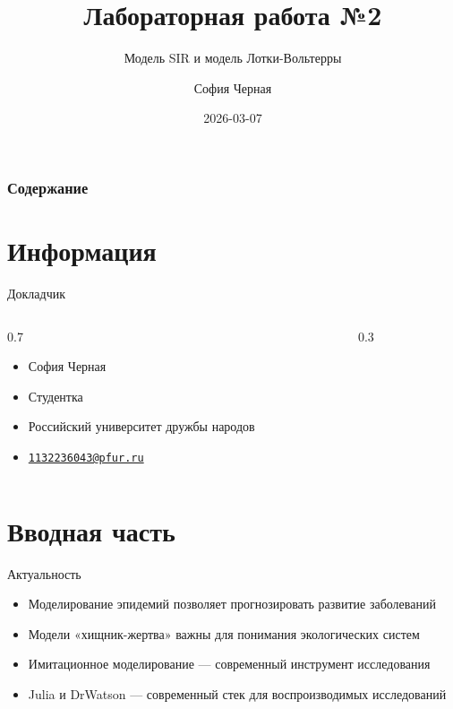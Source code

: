 \documentclass[
  ignorenonframetext,
  aspectratio=169,
  russian,
]{beamer}
\title{Лабораторная работа №2}
\subtitle{Модель SIR и модель Лотки-Вольтерры}
\author{София Черная}
\date{2026-03-07}
\providecommand{\tightlist}{%
  \setlength{\itemsep}{0pt}\setlength{\parskip}{0pt}}\usepackage{longtable,booktabs,array}
\renewcommand*\contentsname{Содержание}
\newcommand\contentsname{Содержание}
\begin{document}
\frame{\titlepage}

\renewcommand*\contentsname{Содержание}
\begin{frame}[allowframebreaks]
  \frametitle{Содержание}
  \setcounter{tocdepth}{1}
  \tableofcontents
\end{frame}

\section{Информация}\label{ux438ux43dux444ux43eux440ux43cux430ux446ux438ux44f}

\begin{frame}{Докладчик}
\label{ux434ux43eux43aux43bux430ux434ux447ux438ux43a}
\begin{columns}[c]
\begin{column}{0.7\linewidth}
\begin{itemize}[<+->]
\tightlist
\item
  София Черная
\item
  Студентка
\item
  Российский университет дружбы народов
\item
  \href{mailto:1132236043@pfur.ru}{\nolinkurl{1132236043@pfur.ru}}
\end{itemize}
\end{column}

\begin{column}{0.3\linewidth}
\end{column}
\end{columns}
\end{frame}

\section{Вводная
часть}\label{ux432ux432ux43eux434ux43dux430ux44f-ux447ux430ux441ux442ux44c}

\begin{frame}{Актуальность}
\label{ux430ux43aux442ux443ux430ux43bux44cux43dux43eux441ux442ux44c}
\begin{itemize}[<+->]
\tightlist
\item
  Моделирование эпидемий позволяет прогнозировать развитие заболеваний
\item
  Модели «хищник-жертва» важны для понимания экологических систем
\item
  Имитационное моделирование --- современный инструмент исследования
\item
  Julia и DrWatson --- современный стек для воспроизводимых исследований
\end{itemize}
\end{frame}
\end{document}
